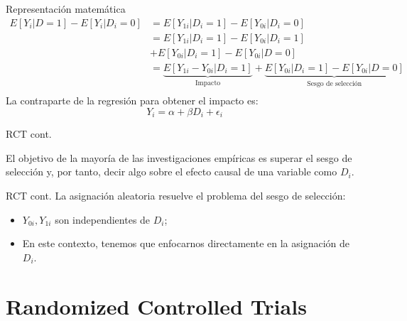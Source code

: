 \documentclass[11pt, aspectratio=169, compress]{beamer}
\begin{document}
\begin{frame}{Representación matemática}
\begin{align*}
E[Y_i | D=1] - E[Y_i | D_i=0] &= E[Y_{1i} | D_i=1] - E[Y_{0i} | D_i=0] \\
&= E[Y_{1i} | D_i=1] - E[Y_{0i} | D_i=1] \\
&+ E[Y_{0i} | D_i=1] - E[Y_{0i} | D=0] \\ 
&= \underbrace{E[Y_{1i} - Y_{0i} | D_i=1]}_{\text{Impacto}} +  \underbrace{E[Y_{0i} | D_i=1] - E[Y_{0i} | D=0]}_{\text{Sesgo de selección}}\\ 
\end{align*}
La contraparte de la regresión para obtener el impacto es:
\begin{equation}
Y_i = \alpha + \beta D_{i} + \epsilon_i 
\end{equation}
\end{frame}
\begin{frame}{RCT cont.}
	\begin{center}
		El objetivo de la mayoría de las investigaciones empíricas es superar el sesgo de selección y, por tanto, decir algo sobre el efecto causal de una variable como $D_i$. 
	\end{center}
\end{frame}
\begin{frame}{RCT cont.}
	La asignación aleatoria resuelve el problema del sesgo de selección: 
	\begin{itemize}
		\item $Y_{0i}, Y_{1i}$ son independientes de $D_i$; 
		\item En este contexto, tenemos que enfocarnos directamente en la asignación de $D_i$.
	\end{itemize}
\end{frame}
\section{Randomized Controlled Trials}
\end{document}
